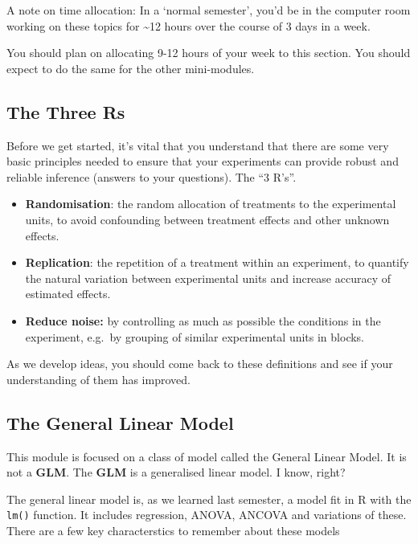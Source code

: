 \documentclass[
]{book}
\providecommand{\tightlist}{%
  \setlength{\itemsep}{0pt}\setlength{\parskip}{0pt}}
\begin{document}
A note on time allocation: In a `normal semester', you'd be in the computer room working on these topics for \textasciitilde12 hours over the course of 3 days in a week.

You should plan on allocating 9-12 hours of your week to this section. You should expect to do the same for the other mini-modules.

\hypertarget{the-three-rs}{%
\subsection{The Three Rs}\label{the-three-rs}}

Before we get started, it's vital that you understand that there are some very basic principles needed to ensure that your experiments can provide robust and reliable inference (answers to your questions). The ``3 R's''.

\begin{itemize}
\tightlist
\item
  \textbf{Randomisation}: the random allocation of treatments to the experimental units, to avoid confounding between treatment effects and other unknown effects.
\item
  \textbf{Replication}: the repetition of a treatment within an experiment, to quantify the natural variation between experimental units and increase accuracy of estimated effects.
\item
  \textbf{Reduce noise:} by controlling as much as possible the conditions in the experiment, e.g.~by grouping of similar experimental units in blocks.
\end{itemize}

As we develop ideas, you should come back to these definitions and see if your understanding of them has improved.

\hypertarget{the-general-linear-model}{%
\subsection{The General Linear Model}\label{the-general-linear-model}}

This module is focused on a class of model called the General Linear Model. It is not a \textbf{GLM}. The \textbf{GLM} is a generalised linear model. I know, right?

The general linear model is, as we learned last semester, a model fit in R with the \texttt{lm()} function. It includes regression, ANOVA, ANCOVA and variations of these. There are a few key characterstics to remember about these models
\end{document}
